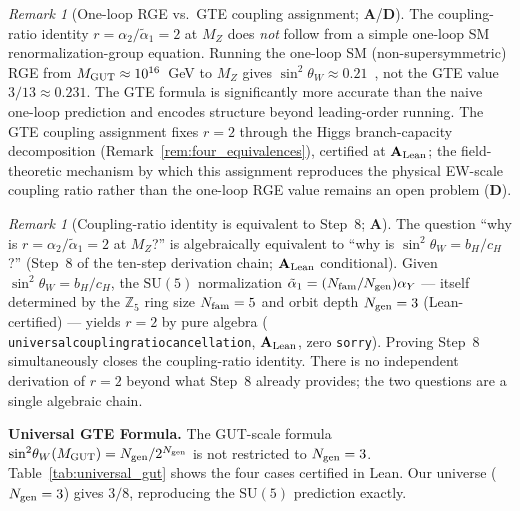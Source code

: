\documentclass[11pt]{article}
\theoremstyle{remark}
\newtheorem{remark}[theorem]{Remark}
\newcommand{\Ngen}{N_{\rm gen}}
\newcommand{\Nfam}{N_{\rm fam}}
\newcommand{\bH}{b_H}
\newcommand{\cH}{c_H}
\newcommand{\lean}[1]{%
  \penalty-100
  \begingroup\def\_{\textunderscore\allowbreak}\texttt{#1}\endgroup}
\newcommand{\sinwsq}{\sin^2\!\theta_W}
\newcommand{\CatA}{\textbf{A}}
\newcommand{\CatAL}{\ensuremath{\textbf{A}_{\rm Lean}}}
\newcommand{\CatD}{\textbf{D}}
\begin{document}
\begin{remark}[One-loop RGE vs.\ GTE coupling assignment; $\CatA$/$\CatD$]
\label{rem:path_c_honest}
The coupling-ratio identity $r = \alpha_2/\tilde\alpha_1 = 2$ at $M_Z$ does \emph{not}
follow from a simple one-loop SM renormalization-group equation.
Running the one-loop SM (non-supersymmetric) RGE from $M_{\rm GUT} \approx 10^{16}$~GeV
to $M_Z$ gives $\sin^2\!\theta_W \approx 0.21$~\cite{GeorgiGlashow1974}, not the
GTE value $3/13 \approx 0.231$.
The GTE formula is significantly more accurate than the naive one-loop prediction and
encodes structure beyond leading-order running.
The GTE coupling assignment fixes $r = 2$ through the Higgs branch-capacity
decomposition (Remark~\ref{rem:four_equivalences}), certified at $\CatAL$; the
field-theoretic mechanism by which this assignment reproduces the physical EW-scale
coupling ratio rather than the one-loop RGE value remains an open problem ($\CatD$).
\end{remark}

\begin{remark}[Coupling-ratio identity is equivalent to Step~8; $\CatA$]
\label{rem:path_bc_equivalence}
The question ``why is $r = \alpha_2/\tilde\alpha_1 = 2$ at $M_Z$?'' is algebraically
equivalent to ``why is $\sinwsq = \bH/\cH$?'' (Step~8 of the ten-step derivation
chain; $\CatAL$ conditional).
Given $\sinwsq = \bH/\cH$, the $\mathrm{SU}(5)$ normalization
$\tilde\alpha_1 = (\Nfam/\Ngen)\alpha_Y$ — itself determined by the $\mathbb{Z}_5$
ring size $\Nfam = 5$ and orbit depth $\Ngen = 3$ (Lean-certified) — yields
$r = 2$ by pure algebra (\lean{universal\_coupling\_ratio\_cancellation}, $\CatAL$,
zero \texttt{sorry}).
Proving Step~8 simultaneously closes the coupling-ratio identity.
There is no independent derivation of $r = 2$ beyond what Step~8 already provides;
the two questions are a single algebraic chain.
\end{remark}

\medskip

\noindent\textbf{Universal GTE Formula.}\enspace
The GUT-scale formula $\sinwsq(M_{\rm GUT}) = \Ngen/2^{\Ngen}$ is not restricted
to $\Ngen = 3$.
Table~\ref{tab:universal_gut} shows the four cases certified in Lean.
Our universe ($\Ngen = 3$) gives $3/8$, reproducing the $\mathrm{SU}(5)$ prediction
exactly.
\end{document}
